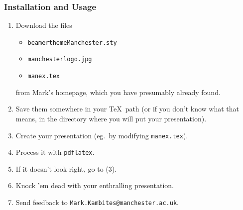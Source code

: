 \documentclass{beamer}
\begin{document}
\begin{frame}
   \frametitle{Installation and Usage}
\begin{enumerate}
\item<1-> Download the files
\begin{itemize}
\item \texttt{beamerthemeManchester.sty}
\item \texttt{manchesterlogo.jpg}
\item \texttt{manex.tex}
\end{itemize}
from Mark's homepage, which you have presumably already found.

\item<2-> Save them somewhere in your \TeX \ path (or if you don't know
what that means, in the directory where you will put your
presentation).

\item<3-> Create your presentation (eg.~by modifying \texttt{manex.tex}).

\item<4-> Process it with \texttt{pdflatex}.

\item<5-> If it doesn't look right, go to (3).

\item<6-> Knock 'em dead with your enthralling presentation.

\item<7-> Send feedback to \texttt{Mark.Kambites@manchester.ac.uk}.
\end{enumerate}
\end{frame}
\end{document}
